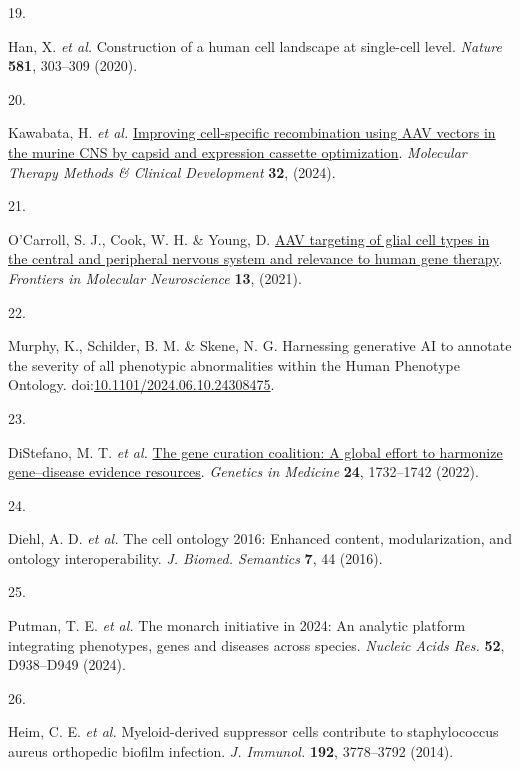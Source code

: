 \documentclass[
]{article}
\newlength{\cslhangindent}
\newlength{\csllabelwidth}
\newenvironment{CSLReferences}[2] %
 {\begin{list}{}{%
  \setlength{\itemindent}{0pt}
  \setlength{\leftmargin}{0pt}
  \setlength{\parsep}{0pt}
  \ifodd #1
   \setlength{\leftmargin}{\cslhangindent}
   \setlength{\itemindent}{-1\cslhangindent}
  \fi
  \setlength{\itemsep}{#2\baselineskip}}}
 {\end{list}}
\newcommand{\CSLLeftMargin}[1]{\parbox[t]{\csllabelwidth}{\strut#1\strut}}
\newcommand{\CSLRightInline}[1]{\parbox[t]{\linewidth - \csllabelwidth}{\strut#1\strut}}
\begin{document}
\begin{CSLReferences}{0}{0}
\CSLLeftMargin{19. }%
\CSLRightInline{Han, X. \emph{et al.} Construction of a human cell
landscape at single-cell level. \emph{Nature} \textbf{581}, 303--309
(2020).}

\CSLLeftMargin{20. }%
\CSLRightInline{Kawabata, H. \emph{et al.}
\href{https://doi.org/10.1016/j.omtm.2024.101185}{Improving
cell-specific recombination using AAV vectors in the murine CNS by
capsid and expression cassette optimization}. \emph{Molecular Therapy
Methods \& Clinical Development} \textbf{32}, (2024).}

\CSLLeftMargin{21. }%
\CSLRightInline{O'Carroll, S. J., Cook, W. H. \& Young, D.
\href{https://doi.org/10.3389/fnmol.2020.618020}{AAV targeting of glial
cell types in the central and peripheral nervous system and relevance to
human gene therapy}. \emph{Frontiers in Molecular Neuroscience}
\textbf{13}, (2021).}

\CSLLeftMargin{22. }%
\CSLRightInline{Murphy, K., Schilder, B. M. \& Skene, N. G. Harnessing
generative AI to annotate the severity of all phenotypic abnormalities
within the Human Phenotype Ontology.
doi:\href{https://doi.org/10.1101/2024.06.10.24308475}{10.1101/2024.06.10.24308475}.}

\CSLLeftMargin{23. }%
\CSLRightInline{DiStefano, M. T. \emph{et al.}
\href{https://doi.org/10.1016/j.gim.2022.04.017}{The gene curation
coalition: A global effort to harmonize gene--disease evidence
resources}. \emph{Genetics in Medicine} \textbf{24}, 1732--1742 (2022).}

\CSLLeftMargin{24. }%
\CSLRightInline{Diehl, A. D. \emph{et al.} The cell ontology 2016:
Enhanced content, modularization, and ontology interoperability.
\emph{J. Biomed. Semantics} \textbf{7}, 44 (2016).}

\CSLLeftMargin{25. }%
\CSLRightInline{Putman, T. E. \emph{et al.} The monarch initiative in
2024: An analytic platform integrating phenotypes, genes and diseases
across species. \emph{Nucleic Acids Res.} \textbf{52}, D938--D949
(2024).}

\CSLLeftMargin{26. }%
\CSLRightInline{Heim, C. E. \emph{et al.} Myeloid-derived suppressor
cells contribute to staphylococcus aureus orthopedic biofilm infection.
\emph{J. Immunol.} \textbf{192}, 3778--3792 (2014).}


\end{CSLReferences}
\end{document}

